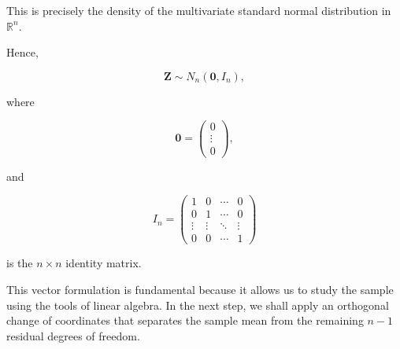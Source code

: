 \documentclass[11pt]{article}
\begin{document}
\begin{mdframed}[
		linewidth=0.8pt,
		roundcorner=6pt,
		backgroundcolor=gray!5,
		linecolor=gray!60,
		innertopmargin=10pt,
		innerbottommargin=10pt,
		innerleftmargin=10pt,
		innerrightmargin=10pt
		]
		This is precisely the density of the multivariate standard normal
		distribution in $\mathbb R^n$.
		
		Hence,
		
		\[
		\boxed{
			\mathbf Z
			\sim
			N_n(\mathbf0,I_n),
		}
		\]
		
		where
		
		\[
		\mathbf0
		=
		\begin{pmatrix}
			0\\
			\vdots\\
			0
		\end{pmatrix},
		\]
		
		and
		
		\[
		I_n
		=
		\begin{pmatrix}
			1&0&\cdots&0\\
			0&1&\cdots&0\\
			\vdots&\vdots&\ddots&\vdots\\
			0&0&\cdots&1
		\end{pmatrix}
		\]
		
		is the $n\times n$ identity matrix.
		
		This vector formulation is fundamental because it allows us to study the
		sample using the tools of linear algebra. In the next step, we shall apply
		an orthogonal change of coordinates that separates the sample mean from the
		remaining $n-1$ residual degrees of freedom.
		
	\end{mdframed}
	
\end{document}
